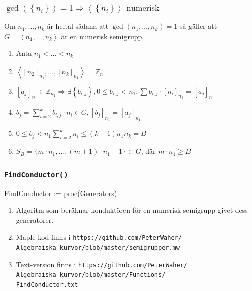 \documentclass{beamer}
\begin{document}
\begin{frame}
	\frametitle{$\gcd(\left\{n_i\right\})=1 \Longrightarrow \left<\left\{n_i\right\}\right> \text{ numerisk}$}
\begin{Theorem}
	Om $n_1, \ldots, n_k$ är heltal sådana att $\gcd(n_1, \ldots, n_k) = 1$ så gäller att $G = \left<n_1, \ldots, n_k\right>$ är en numerisk semigrupp.
\end{Theorem}

\begin{enumerate}
	\item<2->Anta $n_1 < \ldots < n_k$
	\item<3->$\left< \left[n_2\right]_{n_1}, \ldots, \left[n_k\right]_{n_1} \right> = \mathbb{Z}_{n_1}$
	\item<4->$[a_j]_{n_1} \in \mathbb{Z}_{n_1} \Longrightarrow \exists \left\{b_{i,j}\right\}, 0 \leq b_{i,j} < n_1 : \sum b_{i,j} \cdot [n_i]_{n_1} = [a_j]_{n_1}$
	\item<5->$b_j = \sum_{i=2}^{k} b_{i,j} \cdot n_i \in G, [b_j]_{n_1} = [a_j]_{n_1}$
	\item<6->$0 \leq b_j < n_1 \sum_{i=2}^{k} n_i \leq (k-1) n_1 n_k = B$
	\item<7->$S_B = \{m\cdot n_1, \ldots, (m+1)\cdot n_1 - 1\} \subset G$, där $m\cdot n_1 \geq B$
\end{enumerate}
\end{frame}




\begin{frame}
	\frametitle{\texttt{FindConductor()}}
	
	\begin{semiverbatim}
		FindConductor := proc(Generators)
	\end{semiverbatim}
	
	\begin{enumerate}
		\item<1-> Algoritm som beräknar konduktören för en numerisk semigrupp givet dess generatorer.
		
		\item<2-> Maple-kod finns i \texttt{https://github.com/PeterWaher/\\
			\qquad Algebraiska\_kurvor/blob/master/semigrupper.mw}
		
		\item<3-> Text-version finns i
		\texttt{https://github.com/PeterWaher/\\
			\qquad Algebraiska\_kurvor/blob/master/Functions/\\
			\qquad FindConductor.txt} 
	\end{enumerate}
\end{frame}
\end{document}
